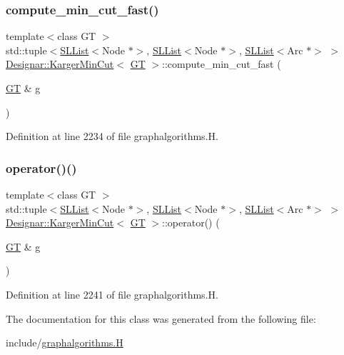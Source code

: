 \subsubsection{\texorpdfstring{compute\+\_\+min\+\_\+cut\+\_\+fast()}{compute\_min\_cut\_fast()}}
{\footnotesize\ttfamily template$<$class GT $>$ \\
std\+::tuple$<$\hyperlink{class_designar_1_1_s_l_list}{S\+L\+List}$<$Node $\ast$$>$, \hyperlink{class_designar_1_1_s_l_list}{S\+L\+List}$<$Node $\ast$$>$, \hyperlink{class_designar_1_1_s_l_list}{S\+L\+List}$<$Arc $\ast$$>$ $>$ \hyperlink{class_designar_1_1_karger_min_cut}{Designar\+::\+Karger\+Min\+Cut}$<$ \hyperlink{demo-buildgraph_8_c_a3001c40d2c31ca87ed96cd7d1334a55e}{GT} $>$\+::compute\+\_\+min\+\_\+cut\+\_\+fast (\begin{DoxyParamCaption}\item[{\hyperlink{demo-buildgraph_8_c_a3001c40d2c31ca87ed96cd7d1334a55e}{GT} \&}]{g }\end{DoxyParamCaption})\hspace{0.3cm}{\ttfamily [inline]}}



Definition at line 2234 of file graphalgorithms.\+H.

\mbox{\label{class_designar_1_1_karger_min_cut_a733802123d2510126abd4238688432ca}} 
\subsubsection{\texorpdfstring{operator()()}{operator()()}}
{\footnotesize\ttfamily template$<$class GT $>$ \\
std\+::tuple$<$\hyperlink{class_designar_1_1_s_l_list}{S\+L\+List}$<$Node $\ast$$>$, \hyperlink{class_designar_1_1_s_l_list}{S\+L\+List}$<$Node $\ast$$>$, \hyperlink{class_designar_1_1_s_l_list}{S\+L\+List}$<$Arc $\ast$$>$ $>$ \hyperlink{class_designar_1_1_karger_min_cut}{Designar\+::\+Karger\+Min\+Cut}$<$ \hyperlink{demo-buildgraph_8_c_a3001c40d2c31ca87ed96cd7d1334a55e}{GT} $>$\+::operator() (\begin{DoxyParamCaption}\item[{\hyperlink{demo-buildgraph_8_c_a3001c40d2c31ca87ed96cd7d1334a55e}{GT} \&}]{g }\end{DoxyParamCaption})\hspace{0.3cm}{\ttfamily [inline]}}



Definition at line 2241 of file graphalgorithms.\+H.



The documentation for this class was generated from the following file\+:\begin{DoxyCompactItemize}
\item 
include/\hyperlink{graphalgorithms_8_h}{graphalgorithms.\+H}\end{DoxyCompactItemize}
